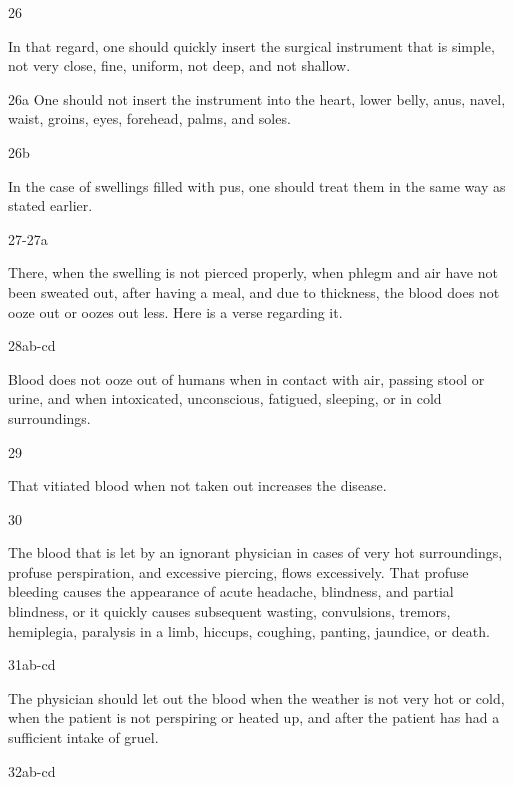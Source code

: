 \begin{translation}
\item[26]

In that regard, one should quickly insert the surgical instrument that is simple, not very close, fine, uniform, not deep, and not shallow. 

\item[26a] 
One should not insert the instrument into the heart, lower belly, anus, navel, waist, groins, eyes, forehead, palms, and soles.

\item[26b]

In the case of swellings filled with pus, one should treat them in the same way as stated earlier.

\item[27-27a]

There, when the swelling is not pierced properly, when phlegm and air have not been sweated out, after having a meal, and due to thickness, the blood does not ooze out or oozes out less.
Here is a verse regarding it.

\item[28ab-cd]

\begin{sloka}
Blood does not ooze out of humans when in contact with air, passing stool or urine, and when intoxicated, unconscious, fatigued, sleeping, or in cold surroundings.
\end{sloka}

\item[29] 

That vitiated blood when not taken out increases the disease.

\item[30]

The blood that is let by an ignorant physician in cases of very hot surroundings, profuse perspiration, and excessive piercing, flows excessively. That profuse bleeding causes the appearance of acute headache, blindness, and partial blindness, or it quickly causes subsequent wasting, convulsions, tremors, hemiplegia, paralysis in a limb, hiccups, coughing, panting, jaundice, or death.  

\item[31ab-cd]

The physician should let out the blood when the weather is not very hot or cold, when the patient is not perspiring or heated up, and after the patient has had a sufficient intake of gruel. 

\item[32ab-cd]


\end{translation}
